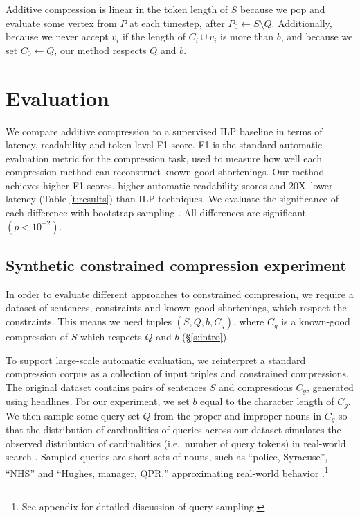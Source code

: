\documentclass[11pt,a4paper]{article}
\newcommand{\speedup}[0]{20X~}
\begin{document}
Additive compression is linear in the token length of $S$ because we pop and evaluate some vertex from $P$ at each timestep, after $P_0  \gets S \setminus Q$. Additionally, because we never accept $v_i$ if the length of $C_i \cup v_i$ is more than $b$, and because we set $C_0 \gets Q$, our method respects $Q$ and $b$.

\section{Evaluation}\label{s:autoeval}

We compare additive compression to a supervised ILP baseline in terms of latency, readability and token-level F1 score. F1 is the standard automatic evaluation metric for the compression task, used to measure how well each compression method can reconstruct known-good shortenings. Our method achieves higher F1 scores, higher automatic readability scores and \speedup lower latency (Table \ref{t:results}) than ILP techniques. We evaluate the significance of each difference with bootstrap sampling \cite{D12-1091}. All differences are significant {\small $(p < 10^{-2})$}. 

\subsection{Synthetic constrained compression experiment}\label{s:constrained}

In order to evaluate different approaches to constrained compression, we require a dataset of sentences, constraints and known-good shortenings, which respect the constraints. This means we need tuples $(S, Q, b, C_g)$, where $C_g$ is a known-good compression of $S$ which respects $Q$ and $b$ (\S\ref{s:intro}).

To support large-scale automatic evaluation, we reinterpret a standard compression corpus \cite{filippova2013overcoming}
as a collection of input triples and constrained compressions. The original dataset contains pairs of sentences $S$ and compressions $C_g$, generated using headlines. For our experiment, we set $b$ equal to  the character length of $C_g$. We then sample some query set $Q$ from the proper and improper nouns in $C_g$ so that the distribution of cardinalities of queries across our dataset simulates the observed distribution of cardinalities (i.e.\ number of query tokens) in real-world search \cite{Jansen2000RealLR}. Sampled queries are short sets of nouns, such as ``police, Syracuse'', ``NHS'' and ``Hughes, manager, QPR,'' approximating real-world behavior \cite{Barr2008TheLS}.\footnote{See appendix for detailed discussion of query sampling.} 
\end{document}
